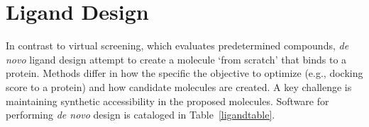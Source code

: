 \section{Ligand Design} 

In contrast to virtual screening, which evaluates predetermined compounds, \textit{de novo} ligand design attempt to create a molecule `from scratch' that binds to a protein.  Methods differ in how the specific the objective to optimize (e.g., docking score to a protein) and how candidate molecules are created.  A key challenge is maintaining synthetic accessibility in the proposed molecules.  Software for performing \textit{de novo} design is cataloged in Table~\ref{ligandtable}.